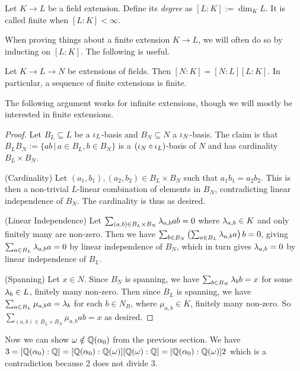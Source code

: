 \documentclass{article}
\begin{document}
\begin{dfn}
  Let $K \to L$ be a field extension.
  Define its \emph{degree} as $[L : K] := \dim_K L$.
  It is called finite when $[L : K] < \infty$.
\end{dfn}

When proving things about a finite extension $K \to L$,
we will often do so by inducting on $[L : K]$.
The following is useful.

\begin{prop}
  
  Let $K \to L \to N$ be extensions of fields.
  Then $[N : K] = [N : L][L : K]$.
  In particular, a sequence of finite extensions is finite.
\end{prop}
The following argument works for infinite extensions,
though we will mostly be interested in finite extensions.
\begin{proof}
  Let $B_L \subseteq L$ be a $\iota_L$-basis and 
  $B_N \subseteq N$ a $\iota_N$-basis. 
  The claim is that $B_L B_N := \{ a b \,|\, a \in B_L, b \in B_N\}$
  is a $(\iota_N \circ \iota_L)$-basis of $N$ and has cardinality $B_L \times B_N$.

  (Cardinality) Let $(a_1, b_1), (a_2, b_2) \in B_L \times B_N$
  such that $ a_1 b_1 = a_2 b_2$. 
  This is then a non-trivial $L$-linear combination of elements in $B_N$,
  contradicting linear independence of $B_N$.
  The cardinality is thus as desired. 

  (Linear Independence) 
  Let $\sum_{(a, b) \in B_L \times B_N} \lambda_{a,b} a b = 0$
  where $\lambda_{a,b} \in K$ and only finitely many are non-zero. 
  Then we have 
  $\sum_{b \in B_N} \left(\sum_{a \in B_L} \lambda_{a,b} a\right) b = 0$,
  giving $\sum_{a \in B_L} \lambda_{a,b} a = 0$ by linear independence of $B_N$,
  which in turn gives $\lambda_{a,b} = 0$ by linear independence of $B_L$.
  
  (Spanning) 
  Let $x \in N$. 
  Since $B_N$ is spanning, we have $\sum_{b \in B_N} \lambda_b b = x$ 
  for some $\lambda_b \in L$, finitely many non-zero. 
  Then since $B_L$ is spanning, 
  we have $\sum_{a \in B_L} \mu_{a,b} a = \lambda_b$ for each $b \in N_B$, 
  where $\mu_{a,b} \in K$, finitely many non-zero. 
  So $\sum_{(a,b) \in B_L \times B_N} \mu_{a, b} a b = x$ as desired. 
\end{proof}

\begin{eg}
  Now we can show $\omega \notin \mathbb{Q}(\alpha_0)$ from the previous section.
  We have $3 = [\mathbb{Q}(\alpha_0) : \mathbb{Q}] = [\mathbb{Q}(\alpha_0) : \mathbb{Q}(\omega)] [\mathbb{Q}(\omega) : \mathbb{Q}]
  = [\mathbb{Q}(\alpha_0) : \mathbb{Q}(\omega)] 2$ which is a contradiction because 2 does not
  divide 3.
\end{eg}
\end{document}
